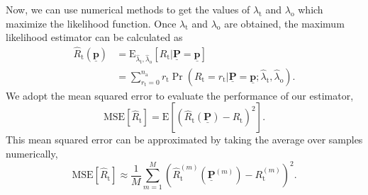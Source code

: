 Now, we can use numerical methods to get the values of $\lambda_{\mathrm{t}}$ and $\lambda_{\mathrm{o}}$ which maximize the likelihood function.
Once $\lambda_{\mathrm{t}}$ and $\lambda_{\mathrm{o}}$ are obtained, the maximum likelihood estimator can be calculated as
\begin{equation} 
\begin{split}
\hat{R}_{\mathrm{t}}
\left( \underline{\mathbf{p}} \right)
&= \mathrm{E}_{\hat{\lambda}_{\mathrm{t}}, \hat{\lambda}_{\mathrm{o}}}
\left[ R_{\mathrm{t}} | \underline{\mathbf{P}}
= \underline{\mathbf{p}} \right] \\
&= \sum_{r_{\mathrm{t}} = 0}^{n_{\mathrm{a}}} r_{\mathrm{t}}
\Pr \left( R_{\mathrm{t}} = r_{\mathrm{t}}
| \underline{\mathbf{P}} = \underline{\mathbf{p}} ;
\hat{\lambda}_{\mathrm{t}}, \hat{\lambda}_{\mathrm{o}} \right) .
\end{split}
\end{equation}
We adopt the mean squared error to evaluate the performance of our estimator,
\begin{equation} \label{equation:MSE}
\mathrm{MSE} \left[ \hat{R}_{\mathrm{t}} \right]
= \mathrm{E} \left[ \left(
\hat{R}_{\mathrm{t}} \left( \underline{\mathbf{P}} \right)
- R_{\mathrm{t}} \right)^2 \right] .
\end{equation}
This mean squared error can be approximated by taking the average over samples numerically,
\begin{equation} \label{equation:EmpiricalMSE}
\mathrm{MSE} \left[ \hat{R}_{\mathrm{t}} \right]
\approx \frac{1}{M} \sum_{m=1}^M \left(
\hat{R}_{\mathrm{t}}^{(m)} \left( \underline{\mathbf{P}}^{(m)} \right)
- R_{\mathrm{t}}^{(m)} \right)^2  .
\end{equation}


